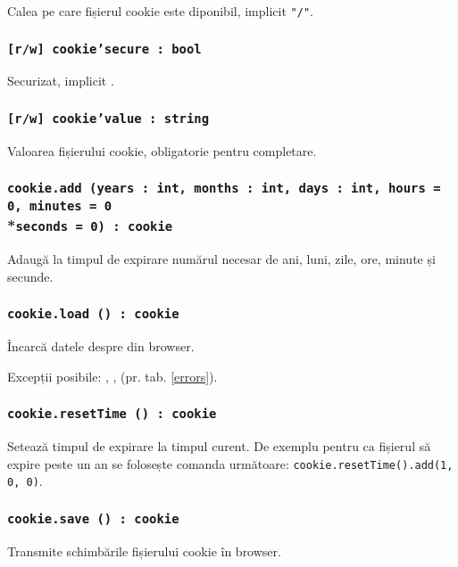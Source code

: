 Calea pe care fișierul cookie este diponibil, implicit \texttt{"/"}.

\subsubsection{\texttt{[r/w] cookie'secure : bool}}

Securizat, implicit \false.

\subsubsection{\texttt{[r/w] cookie'value : string}}

Valoarea fișierului cookie, obligatorie pentru completare.

\subsubsection{\texttt{cookie.add (years : int, months : int, days : int, hours = 0, minutes = 0}\\*\noindent\texttt{seconds = 0) : cookie}}

Adaugă la timpul de expirare numărul necesar de ani, luni, zile, ore, minute și secunde.

\subsubsection{\texttt{cookie.load () : cookie}}

Încarcă datele despre \cookie{} din browser.

Excepții posibile: , ,  (pr. tab. \ref{errors}).

\subsubsection{\texttt{cookie.resetTime () : cookie}}

Setează timpul de expirare la timpul curent. De exemplu pentru ca fișierul să expire peste un an se folosește comanda următoare: \texttt{cookie.resetTime().add(1, 0, 0)}.

\subsubsection{\texttt{cookie.save () : cookie}}

Transmite schimbările fișierului cookie în browser.

